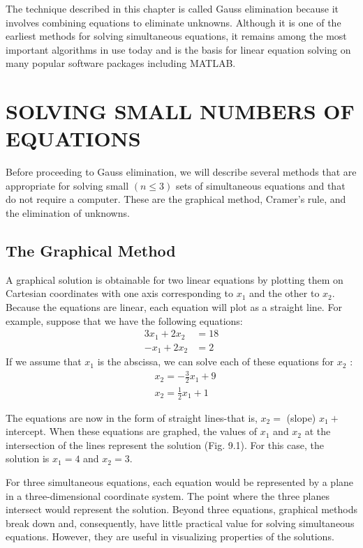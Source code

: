 \documentclass[../main.tex]{subfiles}
\begin{document}
The technique described in this chapter is called Gauss elimination because it involves combining equations to eliminate unknowns. Although it is one of the earliest methods for solving simultaneous equations, it remains among the most important algorithms in use today and is the basis for linear equation solving on many popular software packages including MATLAB.

\newpage
\section{SOLVING SMALL NUMBERS OF EQUATIONS}
\label{sec:sec_9_1}

Before proceeding to Gauss elimination, we will describe several methods that are appropriate for solving small $(n \leq 3)$ sets of simultaneous equations and that do not require a computer. These are the graphical method, Cramer's rule, and the elimination of unknowns.

\subsection{The Graphical Method}

A graphical solution is obtainable for two linear equations by plotting them on Cartesian coordinates with one axis corresponding to $x_{1}$ and the other to $x_{2}$. Because the equations are linear, each equation will plot as a straight line. For example, suppose that we have the following equations:
$$
\begin{aligned}
3 x_{1}+2 x_{2} &=18 \\
-x_{1}+2 x_{2} &=2
\end{aligned}
$$
If we assume that $x_{1}$ is the abscissa, we can solve each of these equations for $x_{2}$ :
$$
\begin{aligned}
&x_{2}=-\frac{3}{2} x_{1}+9 \\
&x_{2}=\frac{1}{2} x_{1}+1
\end{aligned}
$$

The equations are now in the form of straight lines-that is, $x_{2}=$ (slope) $x_{1}+$ intercept. When these equations are graphed, the values of $x_{1}$ and $x_{2}$ at the intersection of the lines represent the solution (Fig. 9.1). For this case, the solution is $x_{1}=4$ and $x_{2}=3$.

For three simultaneous equations, each equation would be represented by a plane in a three-dimensional coordinate system. The point where the three planes intersect would represent the solution. Beyond three equations, graphical methods break down and, consequently, have little practical value for solving simultaneous equations. However, they are useful in visualizing properties of the solutions.
\end{document}
